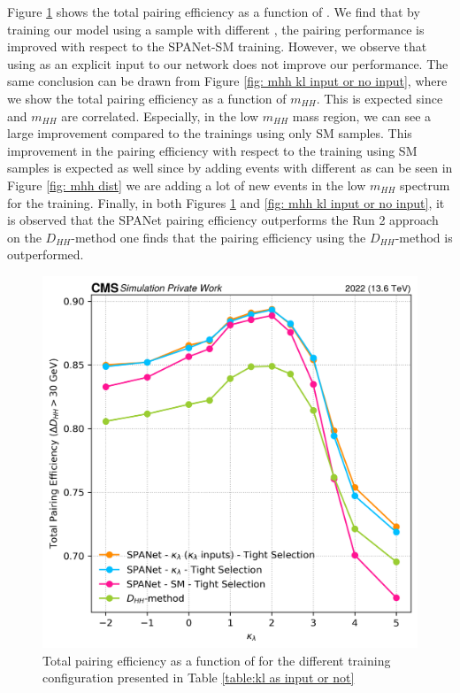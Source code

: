 
Figure \ref{fig: kl kl input or no input} shows the total pairing efficiency as a function of \kl. We find that by training our model using a sample with different \kl, the pairing performance is improved with respect to the SPANet-SM training. However, we observe that using \kl as an explicit input to our network does not improve our performance. The same conclusion can be drawn from Figure \ref{fig: mhh kl input or no input}, where we show the total pairing efficiency as a function of $m_{HH}$. This is expected since \kl and $m_{HH}$ are correlated. Especially, in the low $m_{HH}$ mass region, we can see a large improvement compared to the trainings using only SM samples. This improvement in the pairing efficiency with respect to the training using SM samples is expected as well since by adding events with different \kl as can be seen in Figure \ref{fig: mhh dist} we are adding a lot of new events in the low $m_{HH}$ spectrum for the training. Finally, in both Figures \ref{fig: kl kl input or no input} and \ref{fig: mhh kl input or no input}, it is observed that the SPANet pairing efficiency outperforms the Run 2 approach on the $D_{HH}$-method one finds that the pairing efficiency using the $D_{HH}$-method is outperformed.

\begin{figure}[hbt]
    \centering
    \includegraphics[width=0.6\linewidth]{Images/6.Improving/kappa lambda/kl inout vs no input.png}
    \caption{Total pairing efficiency as a function of \kl for the different training configuration presented in Table \ref{table:kl as input or not}}
    \label{fig: kl kl input or no input}
\end{figure}

